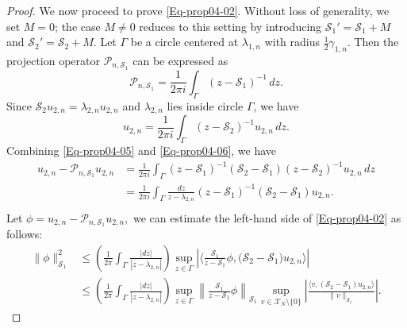 \documentclass{sn-jnl}%
\numberwithin{equation}{section}
\theoremstyle{thmstyleone}%
\theoremstyle{thmstyletwo}%
\theoremstyle{thmstylethree}%
\begin{document}
\begin{appendices}
\begin{proof}
    We now proceed to prove \eqref{Eq-prop04-02}. Without loss of generality, we set $M=0$; the case $M\neq 0$ reduces to this setting by introducing $\mathcal{{S}}_1'=\mathcal{S}_1+M$ and $\mathcal{{S}}_2'=\mathcal{S}_2+M$.  Let $\Gamma$ be a circle centered at $\lambda_{1,n}$ with radius $\frac{1}{2}\gamma_{1,n}$. Then the projection operator $\mathcal{P}_{n,\mathcal{S}_1}$ can be expressed as
    \begin{equation}\label{Eq-prop04-05}
    \mathcal{P}_{n,\mathcal{S}_1} = \frac{1}{2\pi i} \int_{\Gamma} (z - \mathcal{S}_1)^{-1} \, dz.
    \end{equation}
    Since $\mathcal{S}_{2}u_{2,n} = \lambda_{2,n}u_{2,n}$ and $\lambda_{2,n}$ lies inside circle $\Gamma$, we have
    \begin{equation}\label{Eq-prop04-06}
        u_{2,n} = \frac{1}{2\pi i }\int_{\Gamma}(z-\mathcal{S}_2)^{-1}u_{2,n}\, dz.
    \end{equation}
    Combining \eqref{Eq-prop04-05} and \eqref{Eq-prop04-06}, we have
    \begin{equation}
        \begin{aligned}
            u_{2,n}-\mathcal{P}_{n,\mathcal{S}_1}u_{2,n} 
            &= \frac{1}{2\pi i}\int_{\Gamma}(z-\mathcal{S}_1)^{-1}(\mathcal{S}_{2}-\mathcal{S}_1)(z-\mathcal{S}_2)^{-1}u_{2,n}\, dz\\
            &= \frac{1}{2\pi i}\int_{\Gamma}\frac{dz}{z-\lambda_{2,n}}(z-\mathcal{S}_1)^{-1}(\mathcal{S}_2-\mathcal{S}_1)u_{2,n}.\\
        \end{aligned}
    \end{equation}
    Let $\phi = u_{2,n}-\mathcal{P}_{n,\mathcal{S}_1}u_{2,n},$ we can estimate the left-hand side of \eqref{Eq-prop04-02} as follows:
    \begin{equation}
        \begin{aligned}\label{Eq-prop04-07}
             \|\phi\| _{\mathcal{S}_1}^2
             &\leq \left(\frac{1}{2\pi}\int_{\Gamma} \frac{|dz|}{|z-\lambda_{2,n}|}\right)\sup_{z\in \Gamma}\left|\langle \frac{\mathcal{S}_1}{z-\mathcal{S}_1}\phi,\big(\mathcal{S}_2-\mathcal{S}_1\big)u_{2,n}\rangle\right|\\
             &\leq \left(\frac{1}{2\pi}\int_{\Gamma} \frac{|dz|}{|z-\lambda_{2,n}|}\right)
             \sup_{z\in \Gamma}\left\|\frac{\mathcal{S}_1}{z-\mathcal{S}_1}\phi\right\|_{\mathcal{S}_1}
             \sup_{v\in \mathscr{X}_N\setminus\{0\}}\left|\frac{\langle v,(\mathcal{S}_2-\mathcal{S}_1)u_{2,n}\rangle}{\|v\|_{\mathcal{S}_1}}\right|.

\end{aligned}
\end{equation}
\end{proof}
\end{appendices}
\end{document}
